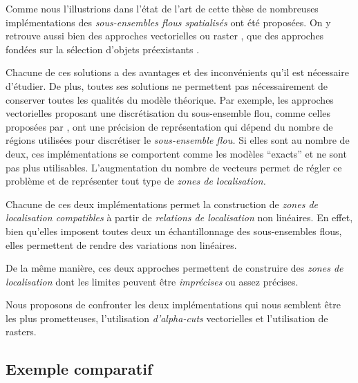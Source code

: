 Comme nous l'illustrions dans l'état de l'art de cette thèse de
nombreuses implémentations des \emph{sous-ensembles flous spatialisés}
ont été proposées. On y retrouve aussi bien des approches vectorielles
\autocite{Kanjilal2010,Dilo2007,Zoghlami2016} ou raster
\autocite{Bloch1996}, que des approches fondées sur la sélection
d'objets préexistants \autocite{Duraciova2017}.

Chacune de ces solutions a des avantages et des inconvénients qu'il
est nécessaire d'étudier. De plus, toutes ses solutions ne permettent
pas nécessairement de conserver toutes les qualités du modèle
théorique. Par exemple, les approches vectorielles proposant une
discrétisation du sous-ensemble flou, comme celles proposées par
\textcite{Kanjilal2010,Zoghlami2016}, ont une précision de
représentation qui dépend du nombre de régions utilisées pour
discrétiser le \emph{sous-ensemble flou.} Si elles sont au nombre de
deux, ces implémentations se comportent comme les modèles
\enquote{exacts} et ne sont pas plus utilisables. L'augmentation du
nombre de vecteurs permet de régler ce problème et de représenter tout
type de \emph{zones de localisation.}




Chacune de ces deux implémentations permet la construction de
\emph{zones de localisation compatibles} à partir de \emph{relations
  de localisation} non linéaires. En effet, bien qu'elles imposent
toutes deux un échantillonnage des sous-ensembles flous, elles
permettent de rendre des variations non linéaires.

De la même manière, ces deux approches permettent de construire des
\emph{zones de localisation} dont les limites peuvent être
\emph{imprécises} ou assez précises.


Nous proposons de confronter les deux implémentations qui nous
semblent être les plus prometteuses, l'utilisation \emph{d'alpha-cuts}
vectorielles et l'utilisation de rasters.

\subsection{Exemple comparatif}

